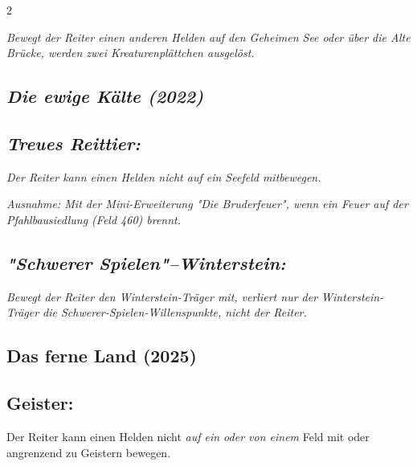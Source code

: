 \documentclass[10pt, a4paper, oneside]{book}
\newcommand{\fan}[1]{\textit{#1}}
\begin{document}
\begin{multicols*}{2}
\begin{bgcolor}[color-DZ]
\fan{Bewegt der Reiter einen anderen Helden auf den Geheimen See oder über die Alte Brücke, werden zwei Kreaturenplättchen ausgelöst.}


\end{bgcolor}


\begin{bgcolor}
\section{\fan{Die ewige Kälte (2022)}}

\subsection{\fan{Treues Reittier:}}


\fan{Der Reiter kann einen Helden nicht auf ein Seefeld mitbewegen.}

\fan{Ausnahme: Mit der Mini-Erweiterung "Die Bruderfeuer", wenn ein Feuer auf der Pfahlbausiedlung (Feld 460) brennt.} 



\subsection{\fan{"Schwerer Spielen"–Winterstein:}} 

\fan{Bewegt der Reiter den Winterstein-Träger mit, verliert nur der Winterstein-Träger die Schwerer-Spielen-Willenspunkte, nicht der Reiter.}

\end{bgcolor}



\begin{bgcolor}
\section{Das ferne Land (2025)}


\subsection{Geister:}

Der Reiter kann einen Helden nicht \fan{auf ein oder von einem} Feld mit oder angrenzend zu Geistern bewegen.


\end{bgcolor}



\end{multicols*}
\end{document}
